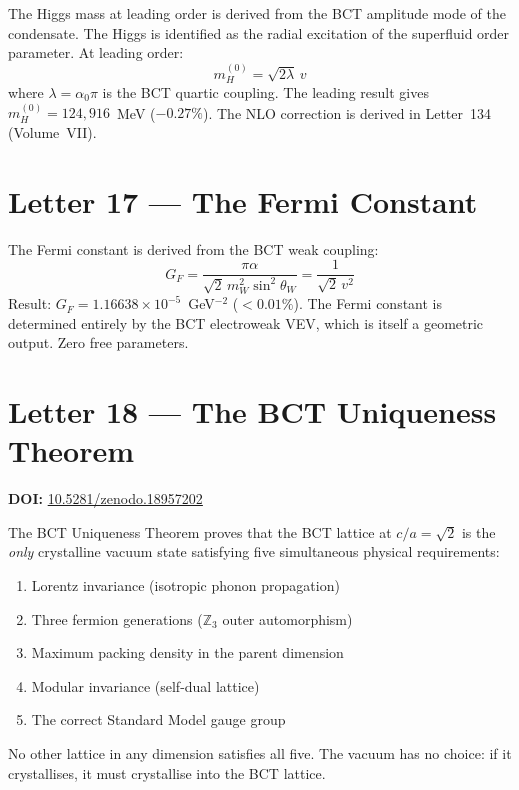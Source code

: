 \documentclass[aps,prl,twocolumn,showpacs,preprintnumbers]{revtex4-2}
\begin{document}
\medskip
The Higgs mass at leading order is derived from the BCT amplitude
mode of the condensate. The Higgs is identified as the radial
excitation of the superfluid order parameter. At leading order:
\begin{equation}
m_H^{(0)} = \sqrt{2\lambda}\,v
\end{equation}
where $\lambda = \alpha_0\pi$ is the BCT quartic coupling. The
leading result gives $m_H^{(0)} = 124{,}916$~MeV ($-0.27\%$).
The NLO correction is derived in Letter~134 (Volume~VII).

\section{Letter 17 --- The Fermi Constant}

\medskip
The Fermi constant is derived from the BCT weak coupling:
\begin{equation}
G_F = \frac{\pi\alpha}{\sqrt{2}\,m_W^2\sin^2\theta_W}
= \frac{1}{\sqrt{2}\,v^2}
\end{equation}
Result: $G_F = 1.16638 \times 10^{-5}$~GeV$^{-2}$ ($<0.01\%$).
The Fermi constant is determined entirely by the BCT electroweak
VEV, which is itself a geometric output. Zero free parameters.

\section{Letter 18 --- The BCT Uniqueness Theorem}
\noindent\textbf{DOI:} \href{https://doi.org/10.5281/zenodo.18957202}{10.5281/zenodo.18957202}

\medskip
The BCT Uniqueness Theorem proves that the BCT lattice at $c/a = \sqrt{2}$
is the \emph{only} crystalline vacuum state satisfying five simultaneous
physical requirements:
\begin{enumerate}
  \item Lorentz invariance (isotropic phonon propagation)
  \item Three fermion generations ($\mathbb{Z}_3$ outer automorphism)
  \item Maximum packing density in the parent dimension
  \item Modular invariance (self-dual lattice)
  \item The correct Standard Model gauge group
\end{enumerate}
No other lattice in any dimension satisfies all five. The vacuum has
no choice: if it crystallises, it must crystallise into the BCT lattice.
\end{document}
